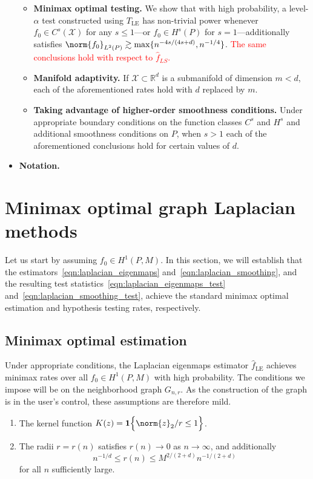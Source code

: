 \documentclass{article}
\newcommand{\Reals}{\mathbb{R}}
\newcommand{\1}{\mathbf{1}}
\newcommand{\Rd}{\Reals^d}
\newcommand{\Leb}{L}
\newcommand{\mc}[1]{\mathcal{#1}}
\newcommand{\wh}[1]{\widehat{#1}}
\newcommand{\LE}{\mathrm{LE}}
\theoremstyle{alden}
\theoremstyle{aldenthm}
\theoremstyle{definition}
\theoremstyle{remark}
\begin{document}
\begin{itemize}
\begin{itemize}
		\item \textbf{Minimax optimal testing.}
		We show that with high probability, a level-$\alpha$ test constructed using $T_{\LE}$ has non-trivial power whenever $f_0 \in C^s(\mc{X})$ for any $s \leq 1$---or $f_0 \in H^s(P)$ for $s = 1$---additionally satisfies $\norm{f_0}_{\Leb^2(P)} \gtrsim \max\{n^{-4s/(4s + d)},n^{-1/4}\}$. \textcolor{red}{The same conclusions hold with respect to $\wh{f}_{LS}$.}
		\item \textbf{Manifold adaptivity.}
		If $\mc{X} \subset \Rd$ is a submanifold of dimension $m < d$, each of the aforementioned rates hold with $d$ replaced by $m$.
		\item \textbf{Taking advantage of higher-order smoothness conditions.} Under appropriate boundary conditions on the function classes $C^s$ and $H^s$ and additional smoothness conditions on $P$, when $s > 1$  each of the aforementioned conclusions hold for certain values of $d$.
	\end{itemize}
	\item \textbf{Notation.}
\end{itemize}

\section{Minimax optimal graph Laplacian methods}
\label{sec:minimax_optimal_graph_Laplacian_methods}

Let us start by assuming $f_0 \in H^1(P,M)$. In this section, we will establish that the estimators~\eqref{eqn:laplacian_eigenmaps} and~\eqref{eqn:laplacian_smoothing}, and the resulting test statistics~\eqref{eqn:laplacian_eigenmaps_test} and~\eqref{eqn:laplacian_smoothing_test}, achieve the standard minimax optimal estimation and hypothesis testing rates, respectively. 

\subsection{Minimax optimal estimation}

Under appropriate conditions, the Laplacian eigenmaps estimator $\wh{f}_{\LE}$ achieves minimax rates over all $f_0 \in H^1(P,M)$ with high probability. The conditions we impose will be on the neighborhood graph $G_{n,r}$. As the construction of the graph is in the user's control, these assumptions are therefore mild.
\begin{enumerate}[label=(K\arabic*)]
	\item 
	\label{asmp:kernel_form}
	The kernel function $K(z) = \1\Bigl\{\norm{z}_2/r \leq 1 \Bigr\}$.
	\item 
	\label{asmp:kernel_radius_estimation}
	The radii $r = r(n)$ satisfies $r(n) \to 0$ as $n \to \infty$, and additionally
	\begin{equation*}
	n^{-1/d}\leq r(n) \leq M^{2/(2 + d)}n^{-1/(2 + d)}
	\end{equation*}
	for all $n$ sufficiently large.
\end{enumerate}
\end{document}
